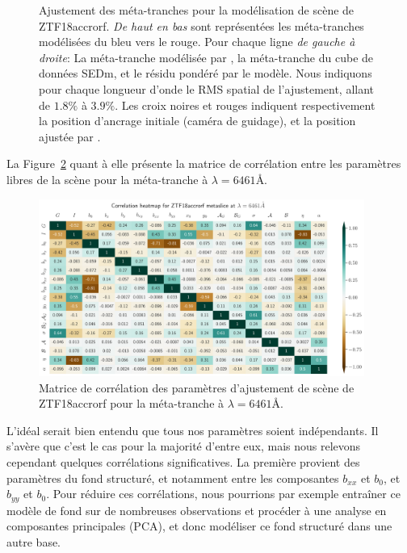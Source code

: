 \documentclass[../main/main.tex]{subfiles}
\begin{document}
\begin{figure}
  \caption[Ajustement des méta-tranches pour la modélisation de scène de ZTF18accrorf.
  ]{Ajustement des méta-tranches pour la modélisation de scène de
    ZTF18accrorf. \emph{De haut en bas} sont représentées les
    méta-tranches modélisées du bleu vers le rouge. Pour chaque ligne
    \emph{de gauche à droite}: La méta-tranche modélisée par \hypergal,
    la méta-tranche du cube de données SEDm, et le résidu pondéré par le
  modèle. Nous indiquons pour chaque longueur d'onde le RMS spatial de
  l'ajustement, allant de $1.8\%$ à $3.9\%$. Les croix noires et rouges
  indiquent respectivement la position d'ancrage initiale (caméra de
  guidage), et la position ajustée par \hypergal.}
  \label{fig:metaslicescene}
\end{figure}

La Figure~\ref{fig:corrmatrixmetaslice} quant à elle présente la matrice
de corrélation entre les paramètres libres de la scène pour la
méta-tranche à $\lambda=6461$\AA.
\begin{figure}
  \centering
  \includegraphics[width=0.95\textwidth]{../figures/07_scene/heatmapcorrelation_metaslice.pdf}
  \caption[Matrice de corrélation des paramètres d'ajustement de scène
  pour une méta-tranche.]{Matrice de corrélation des paramètres
    d'ajustement de scène de ZTF18accrorf pour la méta-tranche à $\lambda=6461$\AA.}
  \label{fig:corrmatrixmetaslice}
\end{figure}
L'idéal serait bien entendu que tous nos paramètres soient
indépendants. Il s'avère que c'est le cas pour la majorité d'entre eux,
mais nous relevons cependant quelques corrélations significatives. La
première provient des paramètres du fond structuré, et notamment entre
les composantes $b_{xx}$ et $b_{0}$, et $b_{yy}$ et $b_{0}$. Pour
réduire ces corrélations, nous pourrions par exemple entraîner ce modèle de fond sur
de nombreuses observations et procéder à une analyse en composantes
principales (PCA), et donc modéliser ce fond structuré dans une autre
base.
\end{document}
